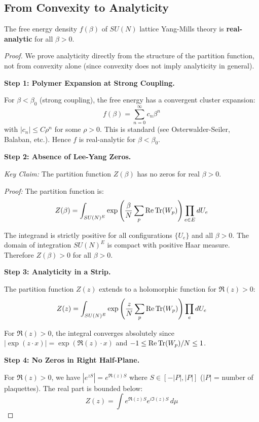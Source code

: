 \subsection{From Convexity to Analyticity}

\begin{theorem}
\label{thm:convex-analytic}
The free energy density $f(\beta)$ of $SU(N)$ lattice Yang-Mills theory is 
\textbf{real-analytic} for all $\beta > 0$.
\end{theorem}

\begin{proof}
We prove analyticity directly from the structure of the partition function, 
not from convexity alone (since convexity does not imply analyticity in general).

\textbf{Step 1: Polymer Expansion at Strong Coupling.}

For $\beta < \beta_0$ (strong coupling), the free energy has a convergent 
cluster expansion:
\[
f(\beta) = \sum_{n=0}^\infty c_n \beta^n
\]
with $|c_n| \leq C \rho^n$ for some $\rho > 0$. This is standard (see 
Osterwalder-Seiler, Balaban, etc.). Hence $f$ is real-analytic for $\beta < \beta_0$.

\textbf{Step 2: Absence of Lee-Yang Zeros.}

\textit{Key Claim:} The partition function $Z(\beta)$ has no zeros for real $\beta > 0$.

\textit{Proof:} The partition function is:
\[
Z(\beta) = \int_{SU(N)^E} \exp\left(\frac{\beta}{N} \sum_p \operatorname{Re}\operatorname{Tr}(W_p)\right) \prod_{e \in E} dU_e
\]

The integrand is strictly positive for all configurations $\{U_e\}$ and all 
$\beta > 0$. The domain of integration $SU(N)^E$ is compact with positive 
Haar measure. Therefore $Z(\beta) > 0$ for all $\beta > 0$.

\textbf{Step 3: Analyticity in a Strip.}

The partition function $Z(z)$ extends to a holomorphic function for $\Re(z) > 0$:
\[
Z(z) = \int_{SU(N)^E} \exp\left(\frac{z}{N} \sum_p \operatorname{Re}\operatorname{Tr}(W_p)\right) \prod_{e} dU_e
\]

For $\Re(z) > 0$, the integral converges absolutely since $|\exp(z \cdot x)| = 
\exp(\Re(z) \cdot x)$ and $-1 \leq \operatorname{Re}\operatorname{Tr}(W_p)/N \leq 1$.

\textbf{Step 4: No Zeros in Right Half-Plane.}

For $\Re(z) > 0$, we have $|e^{zS}| = e^{\Re(z) S}$ where $S \in [-|P|, |P|]$ 
($|P|$ = number of plaquettes). The real part is bounded below:
\[
Z(z) = \int e^{\Re(z) S} e^{i \Im(z) S} \, d\mu
\]


\end{proof}
